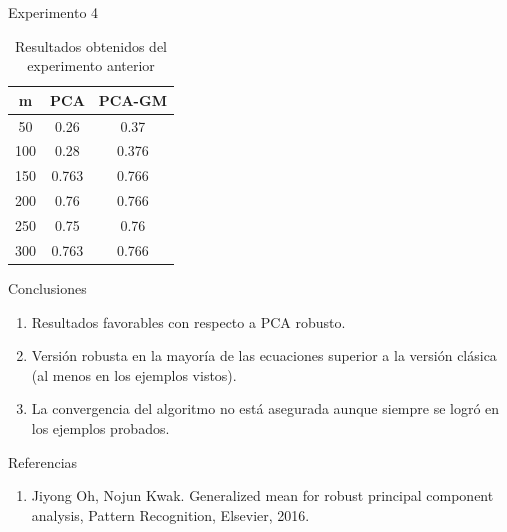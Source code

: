 \documentclass{beamer}
\begin{document}
\begin{frame}{Experimento 4}
	\begin{table}[H]
		\centering
		\caption{Resultados obtenidos del experimento anterior}
		\label{my-label}
		\begin{tabular}{|c|c|c|}
			\hline
			\textbf{m} & \textbf{PCA} & \textbf{PCA-GM} \\ \hline
			50         & 0.26         & 0.37            \\ \hline
			100        & 0.28         & 0.376           \\ \hline
			150        & 0.763        & 0.766           \\ \hline
			200        & 0.76         & 0.766           \\ \hline
			250        & 0.75         & 0.76            \\ \hline
			300        & 0.763        & 0.766           \\ \hline
		\end{tabular}
	\end{table}
\end{frame}

\begin{frame}{Conclusiones}
	\begin{enumerate}
		\item Resultados favorables con respecto a PCA robusto.
		\item Versión robusta en la mayoría de las ecuaciones superior a la versión clásica (al menos en los ejemplos vistos).
		\item La convergencia del algoritmo no está asegurada aunque siempre se logró en los ejemplos probados.
	\end{enumerate}
\end{frame}

\begin{frame}{Referencias}
	\begin{enumerate}
		\item Jiyong Oh, Nojun Kwak. Generalized mean for robust principal component analysis, Pattern Recognition, Elsevier, 2016.
	\end{enumerate}
\end{frame}
\end{document}
